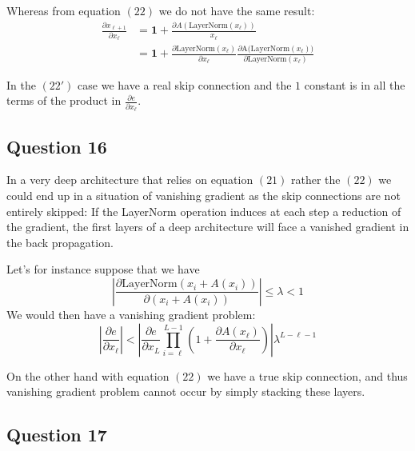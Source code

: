 \documentclass{article}
\begin{document}
Whereas from equation $(22)$ we do not have the same result:
\begin{equation*}
    \tag{22'}
    \begin{aligned}
        \frac{\partial x_{\ell + 1}}{\partial x_\ell} & = \mathbf{1} + \frac{\partial A(\text{LayerNorm}(x_\ell))}{x_\ell}                                                                                      \\
                                                      & = \mathbf{1} + \frac{\partial \text{LayerNorm}(x_\ell)}{\partial x_\ell} \frac{\partial \text{A(LayerNorm}(x_\ell))}{\partial \text{LayerNorm}(x_\ell)}
    \end{aligned}
\end{equation*}


In the $(22')$ case we have a real skip connection and the $1$ constant is in all the terms of the product in $\frac{\partial e}{\partial x_\ell}$.

\subsection*{Question 16}
In a very deep architecture that relies on equation $(21)$ rather the $(22)$ we could end up in a situation of vanishing gradient as
the skip connections are not entirely skipped: If the LayerNorm operation induces at each step a reduction of the gradient, the first
layers of a deep architecture will face a vanished gradient in the back propagation.

Let's for instance suppose that we have
\begin{equation*}
    \left|\frac{\partial \text{LayerNorm}(x_i + A(x_i))}{\partial (x_i + A(x_i))} \right| \le \lambda < 1
\end{equation*}
We would then have a vanishing gradient problem:
\begin{equation*}
    \left|\frac{\partial e}{\partial x_\ell}\right| < \left| \frac{\partial e}{\partial x_L}\prod_{i=\ell}^{L-1} \left(1 + \frac{\partial A(x_\ell)}{\partial x_\ell}\right )\right| \lambda^{L - \ell - 1}
\end{equation*}

On the other hand with equation $(22)$ we have a true skip connection, and thus vanishing gradient problem cannot occur by simply stacking these
layers.

\subsection*{Question 17}

{\small
    
    
}
\end{document}
